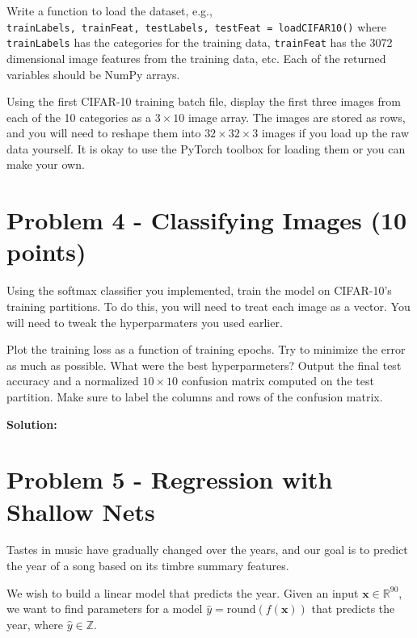 \documentclass[11pt, oneside]{article}   	%
\begin{document}
Write a function to load the dataset, e.g., \\ \texttt{trainLabels, trainFeat, testLabels, testFeat = loadCIFAR10()} where \texttt{trainLabels} has the categories for the training data, \texttt{trainFeat} has the 3072 dimensional image features from the training data, etc. Each of the returned variables should be NumPy arrays.

Using the first CIFAR-10 training batch file, display the first three images from each of the 10 categories as a $3 \times 10$ image array. The images are stored as rows, and you will need to reshape them into $32 \times 32 \times 3$ images if you load up the raw data yourself. It is okay to use the PyTorch toolbox for loading them or you can make your own. 



\section*{Problem 4 - Classifying Images (10 points)}

Using the softmax classifier you implemented, train the model on CIFAR-10's training partitions. To do this, you will need to treat each image as a vector. You will need to tweak the hyperparmaters you used earlier. 

Plot the training loss as a function of training epochs. Try to minimize the error as much as possible. What were the best hyperparmeters? Output the final test accuracy and a normalized $10 \times 10$ confusion matrix computed on the test partition. Make sure to label the columns and rows of the confusion matrix.

\textbf{Solution:}\\


\section*{Problem 5 - Regression with Shallow Nets}


Tastes in music have gradually changed over the years, and our goal is to predict the year of a song based on its timbre summary features. 


We wish to build a linear model that predicts the year. Given an input $\mathbf{x} \in \mathbb{R}^{90}$, we want to find parameters for a model $\hat{y} = \mathrm{round} \left(f \left( \mathbf{x} \right) \right)$ that predicts the year, where $\hat{y} \in \mathbb{Z}$. 
\end{document}

